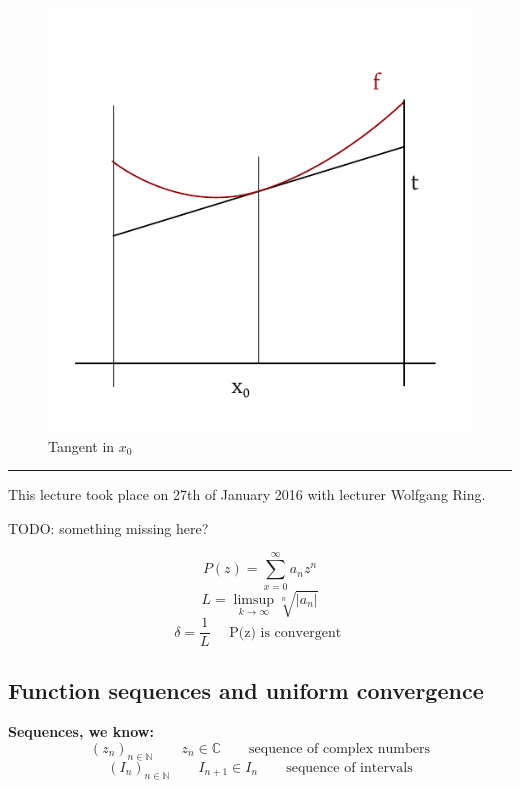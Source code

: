 \documentclass[a4paper,landscape,twocolumn]{article}
\theoremstyle{definition}
\newcommand\abs[1]{\left|#1\right|}
\newcommand\seq[1]{{\left(#1\right)}_{n \in \mathbb N}}
\newcommand\meta[3]{\hrule{} This #1 took place on #2 with lecturer #3.\par}
\begin{document}
\begin{figure}[!h]
  \begin{center}
    \includegraphics{img/tangent_convex.pdf}
    \caption{Tangent in $x_0$}
    \label{img:tangent-convex}
  \end{center}
\end{figure}

\meta{lecture}{27th of January 2016}{Wolfgang Ring}

TODO: something missing here?

\[ P(z) = \sum_{x=0}^\infty a_n z^n \]
\[ L = \limsup_{k\to\infty} \sqrt[n]{\abs{a_n}} \]
\[ \delta = \frac1L \quad \text{ P(z) is convergent } \]

\subsection{Function sequences and uniform convergence}

\textbf{Sequences, we know:}
\[ \seq{z_n} \qquad z_n \in \mathbb C \qquad \text{sequence of complex numbers} \]
\[ \seq{I_n} \qquad I_{n+1} \in I_n \qquad \text{sequence of intervals} \]
\end{document}
